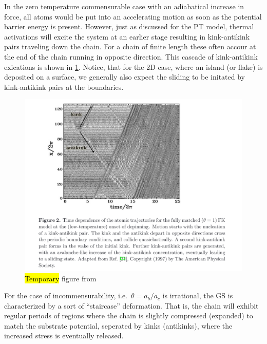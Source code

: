 In the zero temperature commensurable case with an adiabatical increase in force, all atoms would be put into an accelerating motion as soon as the potential barrier energy is present. However, just as discussed for the \acrshort{PT} model, thermal activations will excite the system at an earlier stage resulting in kink-antikink pairs traveling down the chain. For a chain of finite length these often accour at the end of the chain running in opposite direction. This cascade of kink-antikink exications is shown in \cref{fig:kink_antikink}. Notice, that for the 2D case, where an island (or flake) is deposited on a surface, we generally also expect the sliding to be initated by kink-antikink pairs at the boundaries. 

\begin{figure}[H]
  \centering
  \includegraphics[width=0.8\linewidth]{figures/theory/kink_antikink.png}
  \caption{\hl{Temporary} figure from \cite{Manini_2016}}
  \label{fig:kink_antikink}
\end{figure}


For the case of incommensurability, i.e.\ $\theta = a_b/a_c$ is irrational, the
\acrshort{GS} is characterized by a sort of ``staircase''  deformation. That is, the chain will exhibit regular periods of regions where the chain is slightly compressed (expanded) to match the substrate potential, seperated by kinks (antikinks), where the increased stress is eventually released.



